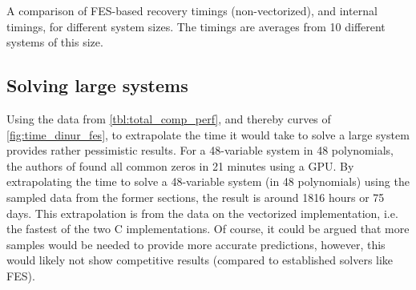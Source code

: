 \begin{table}[t]
    \begin{center}
    \end{center}
    \caption{A comparison of FES-based recovery timings (non-vectorized), and internal timings, for different system sizes. The timings are averages from 10 different systems of this size.} \label{tbl:fes_comp_perf}
\end{table}

\subsection{Solving large systems} \label{sec:eval:large}
Using the data from \cref{tbl:total_comp_perf}, and thereby curves of \cref{fig:time_dinur_fes}, to extrapolate the time it would take to solve a large system provides rather pessimistic results. For a 48-variable system in 48 polynomials, the authors of \cite{ches-2010-23990} found all common zeros in 21 minutes using a GPU. By extrapolating the time to solve a 48-variable system (in 48 polynomials) using the sampled data from the former sections, the result is around 1816 hours or 75 days. This extrapolation is from the data on the vectorized implementation, i.e. the fastest of the two C implementations. Of course, it could be argued that more samples would be needed to provide more accurate predictions, however, this would likely not show competitive results (compared to established solvers like FES). 

